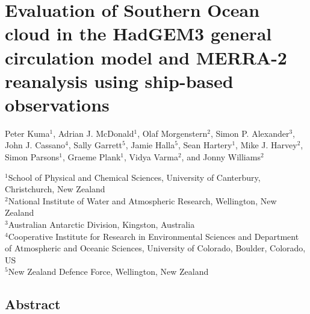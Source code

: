 \chapter{Evaluation of Southern Ocean cloud in the HadGEM3 general
circulation model and MERRA-2 reanalysis using ship-based
observations}

\vspace{-0.1cm}
\sffamily
\linespread{1.6}
\raggedright
Peter Kuma$^1$, Adrian J. McDonald$^1$, Olaf Morgenstern$^2$, Simon P.  Alexander$^3$, John J. Cassano$^4$, Sally Garrett$^5$, Jamie Halla$^5$, Sean Hartery$^1$, Mike J. Harvey$^2$, Simon Parsons$^1$, Graeme Plank$^1$, Vidya Varma$^2$, and Jonny Williams$^2$
\footnotesize

\linespread{1}
\vspace{0.2cm}
\noindent
$^1$School of Physical and Chemical Sciences, University of Canterbury, Christchurch, New Zealand\\
$^2$National Institute of Water and Atmospheric Research, Wellington, New Zealand\\
$^3$Australian Antarctic Division, Kingston, Australia\\
$^4$Cooperative Institute for Research in Environmental Sciences and Department of Atmospheric and Oceanic Sciences, University of Colorado, Boulder, Colorado, US\\
$^5$New Zealand Defence Force, Wellington, New Zealand
\normalsize
\normalfont
\justify

\section*{Abstract}

